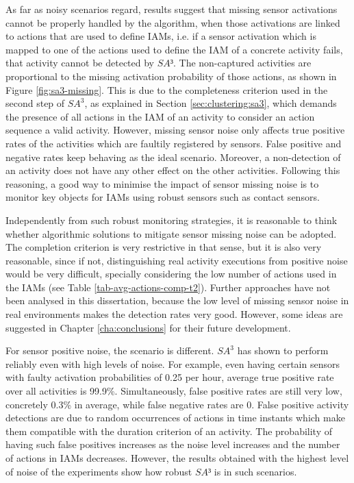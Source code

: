 As far as noisy scenarios regard, results suggest that missing sensor activations cannot be properly handled by the algorithm, when those activations are linked to actions that are used to define IAMs, i.e. if a sensor activation which is mapped to one of the actions used to define the IAM of a concrete activity fails, that activity cannot be detected by $SA³$. The non-captured activities are proportional to the missing activation probability of those actions, as shown in Figure \ref{fig:sa3-missing}. This is due to the completeness criterion used in the second step of $SA^3$, as explained in Section \ref{sec:clustering:sa3}, which demands the presence of all actions in the IAM of an activity to consider an action sequence a valid activity. However, missing sensor noise only affects true positive rates of the activities which are faultily registered by sensors. False positive and negative rates keep behaving as the ideal scenario. Moreover, a non-detection of an activity does not have any other effect on the other activities. Following this reasoning, a good way to minimise the impact of sensor missing noise is to monitor key objects for IAMs using robust sensors such as contact sensors.  

Independently from such robust monitoring strategies, it is reasonable to think whether algorithmic solutions to mitigate sensor missing noise can be adopted. The completion criterion is very restrictive in that sense, but it is also very reasonable, since if not, distinguishing real activity executions from positive noise would be very difficult, specially considering the low number of actions used in the IAMs (see Table \ref{tab-avg-actions-comp-t2}). Further approaches have not been analysed in this dissertation, because the low level of missing sensor noise in real environments makes the detection rates very good. However, some ideas are suggested in Chapter \ref{cha:conclusions} for their future development.

For sensor positive noise, the scenario is different. $SA^3$ has shown to perform reliably even with high levels of noise. For example, even having certain sensors with faulty activation probabilities of 0.25 per hour, average true positive rate over all activities is 99.9\%. Simultaneously, false positive rates are still very low, concretely 0.3\% in average, while false negative rates are 0. False positive activity detections are due to random occurrences of actions in time instants which make them compatible with the duration criterion of an activity. The probability of having such false positives increases as the noise level increases and the number of actions in IAMs decreases. However, the results obtained with the highest level of noise of the experiments show how robust $SA³$ is in such scenarios.

